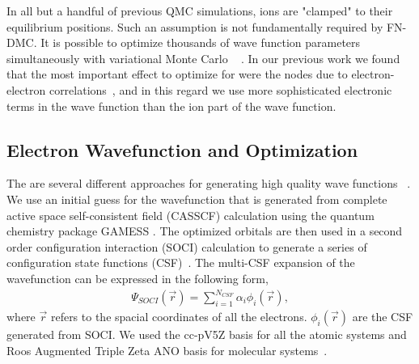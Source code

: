 \documentclass[pra,superscriptaddress,groupedaddress,twocolumn]{revtex4}
\begin{document}
In all but a handful of previous QMC simulations,  ions are "clamped" to their equilibrium positions. Such an assumption is not fundamentally required by FN-DMC.  It is possible to optimize thousands of wave function parameters simultaneously with variational Monte Carlo ~\cite{Nightingale_Linear,Umrigar_Linear,Brown_Bench} .   In our previous work we found that the most important effect to optimize for were the nodes due to electron-electron correlations~\cite{Tubman_ECG}, and in this regard we use more sophisticated electronic terms in the wave function than the ion part of the wave function.  %

\subsection{Electron Wavefunction and Optimization}
The are several different approaches for generating high quality wave functions ~\cite{Umrigar_Alleviation,Toulouse_Bench, Brown_Bench,Seth_Bench}. We use an initial guess for the wavefunction that is generated from complete active space self-consistent field (CASSCF) \cite{Chaban_MCSCF,Szabo} calculation using the quantum chemistry package GAMESS \cite{GAMESS}. The optimized orbitals are then used in a second order configuration interaction (SOCI) calculation to generate a series of configuration state functions (CSF)~\cite{Clark_Bench}. The multi-CSF expansion of the wavefunction  can be expressed in the following form,
\begin{align}
\Psi_{SOCI}(\vec{r})=\sum\limits_{i=1}^{N_{CSF}}\alpha_i\phi_i(\vec{r}), \label{eq:psi_gms}
\end{align}
where $\vec{r}$ refers to the spacial coordinates of all the electrons. $\phi_i(\vec{r})$ are the CSF generated from SOCI. We used the cc-pV5Z basis for all the atomic systems and Roos Augmented Triple Zeta ANO basis for molecular systems~\cite{dunning,roos}. %
\end{document}
